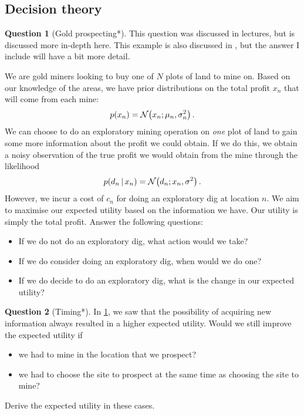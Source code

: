 \documentclass[a4paper]{article}
\theoremstyle{definition}
\newtheorem{question}{Question}
\begin{document}
\subsection{Decision theory}
\begin{question}[Gold prospecting*]
\label{q:gold-prospecting}
This question was discussed in lectures, but is discussed more in-depth here. This example is also discussed in \citet[ch.~36]{itila}, but the answer I include will have a bit more detail.

We are gold miners looking to buy one of $N$ plots of land to mine on. Based on our knowledge of the areas, we have prior distributions on the total profit $x_n$ that will come from each mine:
\begin{align}
p(x_n) = \NormDist{x_n; \mu_n, \sigma^2_n} \,.
\end{align}
We can choose to do an exploratory mining operation on \emph{one} plot of land to gain some more information about the profit we could obtain. If we do this, we obtain a noisy observation of the true profit we would obtain from the mine through the likelihood
\begin{align}
p(d_n\given x_n) = \NormDist{d_n; x_n, \sigma^2} \,.
\end{align}
However, we incur a cost of $c_n$ for doing an exploratory dig at location $n$. We aim to maximise our expected utility based on the information we have. Our utility is simply the total profit. Answer the following questions:
\begin{itemize}
\item If we do not do an exploratory dig, what action would we take?
\item If we do consider doing an exploratory dig, when would we do one?
\item If we do decide to do an exploratory dig, what is the change in our expected utility?
\end{itemize}
\end{question}


\begin{question}[Timing*]
\label{q:timing}
In \cref{q:gold-prospecting}, we saw that the possibility of acquiring new information always resulted in a higher expected utility. Would we still improve the expected utility if
\begin{itemize}
\item we had to mine in the location that we prospect?
\item we had to choose the site to prospect at the same time as choosing the site to mine?
\end{itemize}
Derive the expected utility in these cases.
\end{question}
\end{document}
